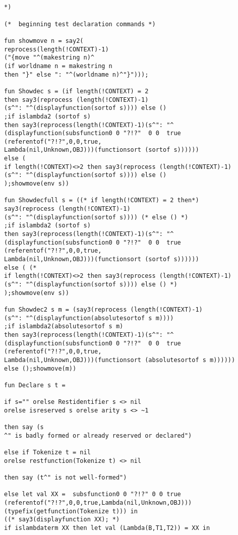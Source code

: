 \documentclass[12pt]{article}
\begin{document}
\begin{verbatim}


*)

(*  beginning test declaration commands *)

fun showmove n = say2(
reprocess(length(!CONTEXT)-1)
("{move "^(makestring n)^
(if worldname n = makestring n 
then "}" else ": "^(worldname n)^"}")));

fun Showdec s = (if length(!CONTEXT) = 2 
then say3(reprocess (length(!CONTEXT)-1)
(s^": "^(displayfunction(sortof s)))) else ()
;if islambda2 (sortof s)
then say3(reprocess(length(!CONTEXT)-1)(s^": "^
(displayfunction(subsfunction0 0 "?!?"  0 0  true 
(referentof("?!?",0,0,true,
Lambda(nil,Unknown,OBJ)))(functionsort (sortof s))))))
else (
if length(!CONTEXT)<>2 then say3(reprocess (length(!CONTEXT)-1)
(s^": "^(displayfunction(sortof s)))) else ()
);showmove(env s))

fun Showdecfull s = ((* if length(!CONTEXT) = 2 then*)
say3(reprocess (length(!CONTEXT)-1)
(s^": "^(displayfunction(sortof s)))) (* else () *)
;if islambda2 (sortof s)
then say3(reprocess(length(!CONTEXT)-1)(s^": "^
(displayfunction(subsfunction0 0 "?!?"  0 0  true 
(referentof("?!?",0,0,true,
Lambda(nil,Unknown,OBJ)))(functionsort (sortof s))))))
else ( (*
if length(!CONTEXT)<>2 then say3(reprocess (length(!CONTEXT)-1)
(s^": "^(displayfunction(sortof s)))) else () *)
);showmove(env s))

fun Showdec2 s m = (say3(reprocess (length(!CONTEXT)-1)
(s^": "^(displayfunction(absolutesortof s m))))
;if islambda2(absolutesortof s m)
then say3(reprocess(length(!CONTEXT)-1)(s^": "^
(displayfunction(subsfunction0 0 "?!?"  0 0  true 
(referentof("?!?",0,0,true,
Lambda(nil,Unknown,OBJ)))(functionsort (absolutesortof s m))))))
else ();showmove(m))

fun Declare s t =

if s="" orelse Restidentifier s <> nil 
orelse isreserved s orelse arity s <> ~1

then say (s
^" is badly formed or already reserved or declared")

else if Tokenize t = nil 
orelse restfunction(Tokenize t) <> nil

then say (t^" is not well-formed")

else let val XX =  subsfunction0 0 "?!?" 0 0 true 
(referentof("?!?",0,0,true,Lambda(nil,Unknown,OBJ))) 
(typefix(getfunction(Tokenize t))) in
((* say3(displayfunction XX); *)
if islambdaterm XX then let val (Lambda(B,T1,T2)) = XX in


\end{verbatim}
\end{document}
